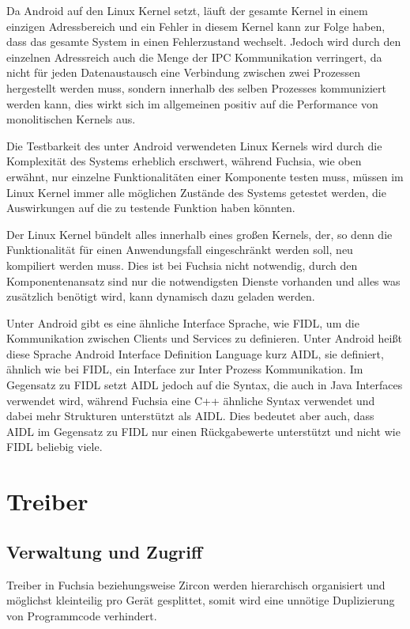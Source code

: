 \documentclass[a4paper]{scrartcl}
\begin{document}
Da Android auf den Linux Kernel setzt, läuft der gesamte Kernel in einem einzigen Adressbereich und ein Fehler in diesem Kernel kann zur Folge haben, dass das gesamte System in einen Fehlerzustand wechselt. Jedoch wird durch den einzelnen Adressreich auch die Menge der IPC Kommunikation verringert, da nicht für jeden Datenaustausch eine Verbindung zwischen zwei Prozessen hergestellt werden muss, sondern innerhalb des selben Prozesses kommuniziert werden kann, dies wirkt sich im allgemeinen positiv auf die Performance von monolitischen Kernels aus.

Die Testbarkeit des unter Android verwendeten Linux Kernels wird durch die Komplexität des Systems erheblich erschwert, während Fuchsia, wie oben erwähnt, nur einzelne Funktionalitäten einer Komponente testen muss, müssen im Linux Kernel immer alle möglichen Zustände des Systems getestet werden, die Auswirkungen auf die zu testende Funktion haben könnten.

Der Linux Kernel bündelt alles innerhalb eines großen Kernels, der, so denn die Funktionalität für einen Anwendungsfall eingeschränkt werden soll, neu kompiliert werden muss. Dies ist bei Fuchsia nicht notwendig, durch den Komponentenansatz sind nur die notwendigsten Dienste vorhanden und alles was zusätzlich benötigt wird, kann dynamisch dazu geladen werden.

Unter Android gibt es eine ähnliche Interface Sprache, wie FIDL, um die Kommunikation zwischen Clients und Services zu definieren. Unter Android heißt diese Sprache Android Interface Definition Language kurz AIDL, sie definiert, ähnlich wie bei FIDL, ein Interface zur Inter Prozess Kommunikation. Im Gegensatz zu FIDL setzt AIDL jedoch auf die Syntax, die auch in Java Interfaces verwendet wird, während Fuchsia eine C++ ähnliche Syntax verwendet und dabei mehr Strukturen unterstützt als AIDL. Dies bedeutet aber auch, dass AIDL im Gegensatz zu FIDL nur einen Rückgabewerte unterstützt und nicht wie FIDL beliebig viele.
\section{Treiber}
\subsection{Verwaltung und Zugriff}
Treiber in Fuchsia beziehungsweise Zircon werden hierarchisch organisiert und möglichst kleinteilig pro Gerät gesplittet, somit wird eine unnötige Duplizierung von Programmcode verhindert.
\end{document}
